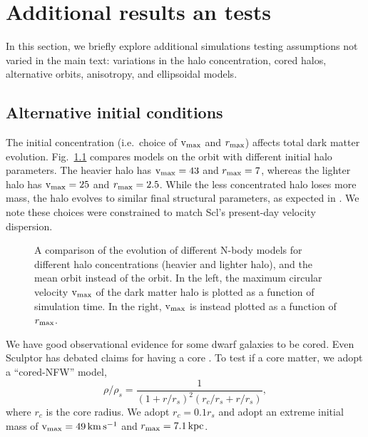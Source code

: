 \chapter{Additional results an tests}\label{sec:extra_results}

In this section, we briefly explore additional simulations testing
assumptions not varied in the main text: variations in the halo
concentration, cored halos, alternative orbits, anisotropy, and
ellipsoidal models.

\section{Alternative initial
conditions}\label{alternative-initial-conditions}

The initial concentration (i.e.~choice of \({\rm v}_{\rm max}\) and \(r_{\rm max}\))
affects total dark matter evolution.
Fig.~\ref{fig:tidal_tracks_concentration} compares models on the
\smallperi{} orbit with different initial halo parameters. The heavier
halo has \({\rm v}_{\rm max}=43\) and \(r_{\rm max}=7\), whereas the lighter halo has
\({\rm v}_{\rm max}=25\) and \(r_{\rm max}=2.5\). While the less concentrated halo loses
more mass, the halo evolves to similar final structural parameters, as
expected in \citet{EN2021}. We note these choices were constrained to
match Scl's present-day velocity dispersion.

\begin{figure}
\centering
{}
\caption[Tidal dependence on halo concentration]{A comparison of the
evolution of different N-body models for different halo concentrations
(heavier and lighter halo), and the mean orbit instead of the
\smallperi{} orbit. In the left, the maximum circular velocity \({\rm v}_{\rm max}\)
of the dark matter halo is plotted as a function of simulation time. In
the right, \({\rm v}_{\rm max}\) is instead plotted as a function of
\(r_{\rm max}\).}\label{fig:tidal_tracks_concentration}
\end{figure}

We have good observational evidence for some dwarf galaxies to be cored.
Even Sculptor has debated claims for having a core
\citep[e.g.,][]{amorisco+zavala+deboer2014, breddels+helmi2013, battaglia+2008, walker+2009a, richardson+fairbairn2014, agnello+evans2012}.
To test if a core matter, we adopt a ``cored-NFW'' model,
\begin{equation}{
\rho/\rho   _s = \frac{1}{(1+r/r_s)^2 (r_c/r_s + r/r_s)},
}\end{equation} where \(r_c\) is the core radius. We adopt
\(r_c = 0.1r_s\) and adopt an extreme initial mass of \({\rm v}_{\rm max}=49\,{\rm km\,s^{-1}}\)
and \(r_{\rm max}=7.1\,{\rm kpc}\).

